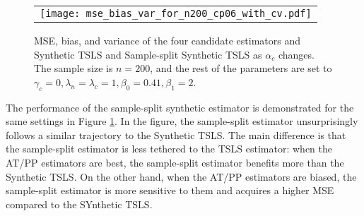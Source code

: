 \documentclass{article}
\begin{document}
\begin{figure}
\centering
\begin{tabular}{c}
\texttt{[image: mse\_bias\_var\_for\_n200\_cp06\_with\_cv.pdf]}
\end{tabular}\vspace{0.2in}
\caption{MSE, bias, and variance of the four candidate estimators and Synthetic TSLS and Sample-split Synthetic TSLS as $\alpha_c$ changes. The sample size is $n = 200$, and the rest of the parameters are set to $\gamma_c = 0, \lambda_n = \lambda_c = 1, \beta_0 = 0.41, \beta_1 = 2$.}\label{mse_plot_2}
\end{figure}
%
The performance of the sample-split synthetic estimator is demonstrated for the same settings in Figure \ref{mse_plot_2}. In the figure, the sample-split estimator unsurprisingly follows a similar trajectory to the Synthetic TSLS. The main difference is that the sample-split estimator is less tethered to the TSLS estimator: when the AT/PP estimators are best, the sample-split estimator benefits more than the Synthetic TSLS. On the other hand, when the AT/PP estimators are biased, the sample-split estimator is more sensitive to them and acquires a higher MSE compared to the SYnthetic TSLS.



\end{document}
